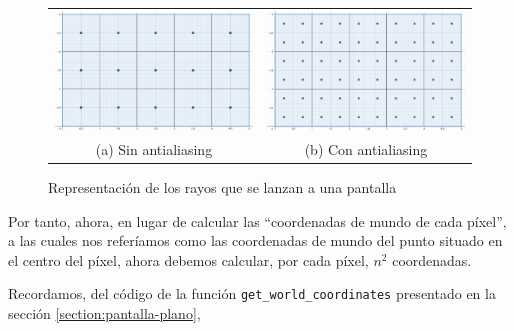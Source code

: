\begin{figure}[ht]
    \centering
    \begin{tabular}{cc}
        \includegraphics[scale=0.20]{img/C7/pixeles-sin-antialiasing.png} &
      \includegraphics[scale=0.20]{img/C7/pixeles-con-antialiasing.png} \\    
    (a) Sin antialiasing & (b) Con antialiasing  \\
    \end{tabular}
    \caption{Representación de los rayos que se lanzan a una pantalla}
    \label{fig:pantalla-antialiasing}
\end{figure}

Por tanto, ahora, en lugar de calcular las ``coordenadas de mundo de cada píxel'', a las cuales nos referíamos como las coordenadas de mundo del punto situado en el centro del píxel, ahora debemos calcular, por cada píxel, $n^2$ coordenadas. 

Recordamos, del código de la función \verb|get_world_coordinates| presentado en la sección \ref{section:pantalla-plano}, 


